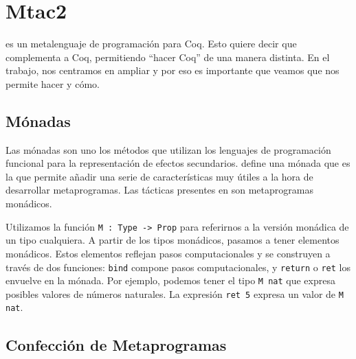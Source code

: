 \chapter{Mtac2}\label{ch:mtac2}

\Mtac \cite{DBLP:journals/pacmpl/KaiserZKRD18} es un metalenguaje de programación para Coq. Esto quiere decir que complementa a Coq, permitiendo ``hacer Coq'' de una manera distinta. En el trabajo, nos centramos en ampliar \Mtac y por eso es importante que veamos que nos permite hacer y cómo.




\section{Mónadas}

Las mónadas son uno los métodos que utilizan los lenguajes de programación funcional para la representación de efectos secundarios.
\Mtac define una mónada que es la que permite añadir una serie de características muy útiles a la hora de desarrollar metaprogramas.
Las tácticas presentes en \mtac son metaprogramas monádicos.

Utilizamos la función \lstinline{M : Type -> Prop} para referirnos a la versión monádica de un tipo cualquiera. A partir de los tipos monádicos, pasamos a tener elementos monádicos. Estos elementos reflejan pasos computacionales y se construyen a través de dos funciones: \lstinline{bind} compone pasos computacionales, y \lstinline{return} o \lstinline{ret} los envuelve en la mónada. Por ejemplo, podemos tener el tipo \lstinline{M nat} que expresa posibles valores de números naturales. La expresión \lstinline{ret 5} expresa un valor de \lstinline{M nat}.

\section{Confección de Metaprogramas}

